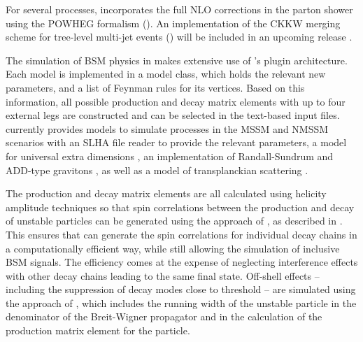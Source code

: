 For several processes, \Herwigpp incorporates the full NLO corrections in
the parton shower \cite{Hamilton:2008pd,Hamilton:2009za,Hamilton:2010mb}
using the POWHEG formalism (). An implementation of
the CKKW merging scheme for tree-level multi-jet events
() will be included in an upcoming
release \cite{Hamilton:2009ne}.

\label{sec:hwbsm}
The simulation of BSM physics in \herwigpp
\cite{Gigg:2007cr,Gigg:2008yc} makes extensive use of \thepeg's plugin
architecture. Each model is implemented in a model class, which
holds the relevant new parameters, and a list of Feynman rules for its
vertices. Based on this information, all possible production and decay
matrix elements with up to four external legs are constructed and can
be selected in the text-based input files. 
\Herwigpp currently provides models to simulate processes in the MSSM
\cite{Haber:1984rc,Gunion:1984yn} and NMSSM \cite{Ellwanger:2009dp}
scenarios with an SLHA \cite{Skands:2003cj,Allanach:2008qq}
 file reader to provide the relevant parameters,
a model for universal extra dimensions
\cite{Cheng:2002iz,Appelquist:2000nn},
an implementation of
Randall-Sundrum \cite{Randall:1999ee}
and ADD-type gravitons \cite{ArkaniHamed:1998rs,Antoniadis:1998ig},
 as well as a model of transplanckian
scattering \cite{Giudice:2001ce}.

The production and decay matrix elements are all calculated using
helicity amplitude techniques so that spin correlations between the
production and decay of unstable particles can be generated using the
approach of \cite{Richardson:2001df}, as described in
.  This ensures that \Herwigpp can
generate the spin correlations for individual decay chains in a
computationally efficient way, while still allowing the simulation of
inclusive BSM signals. The efficiency comes at the expense of
neglecting interference effects with other decay chains leading to the
same final state.  Off-shell effects -- including the suppression of
decay modes close to threshold -- are simulated using the approach of
\cite{Gigg:2008yc}, which includes the running width of the unstable
particle in the denominator of the Breit-Wigner propagator and in the
calculation of the production matrix element for the particle.


\mcsubsection{\gensectionshower}

